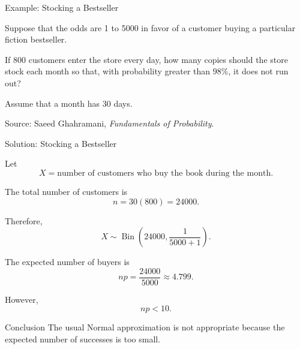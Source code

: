 

\begin{frame}{Example: Stocking a Bestseller}

Suppose that the odds are 1 to 5000 in favor of a customer buying a particular fiction bestseller.

If \(800\) customers enter the store every day, how many copies should the
store stock each month so that, with probability greater than \(98\%\), it
does not run out?

Assume that a month has \(30\) days.

\vfill

{\scriptsize
Source: Saeed Ghahramani, \emph{Fundamentals of Probability}.
}

\end{frame}


\begin{frame}{Solution: Stocking a Bestseller}

Let
\[
X=\text{number of customers who buy the book during the month}.
\]

The total number of customers is
\[
n=30(800)=24000.
\]
 

Therefore,
\[
X\sim\operatorname{Bin}\left(24000,\frac{1}{5000 + 1}\right).
\]

The expected number of buyers is
\[
np
=
\frac{24000}{5000}
\approx
4.799.
\]

However,
\[
np<10.
\]

\begin{keybox}{Conclusion}
The usual Normal approximation is not appropriate because the expected
number of successes is too small.
\end{keybox}

\end{frame}


